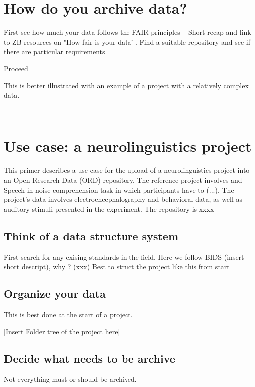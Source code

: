\documentclass[a4paper,11pt]{report}
\begin{document}
\section*{How do you archive data?}
 First see how much your data follows the FAIR principles -- Short recap and link to ZB resources on "How fair is your data' . 
 Find a suitable repository and see if there are particular requirements
 
 Proceed

This is better illustrated with an example of a project with a relatively complex data. 

--------

\section*{Use case: a neurolinguistics project} 
This primer describes a use case for the upload of a neurolinguistics project into an Open Research Data (ORD) repository. The reference project involves and Speech-in-noise comprehension task in which participants have to (...). The project's data involves electroencephalography and behavioral data, as well as auditory stimuli presented in the experiment. The repository is xxxx 

\subsection*{Think of a data structure system}

First search for any exising standards in the field. Here we follow BIDS (insert short descript), why ? (xxx)
Best to struct the project like this from start

\subsection*{Organize your data}
This is best done at the start of a project.

[Insert Folder tree of the project here]


\subsection*{Decide what needs to be archive}
Not everything must or should be archived. 
\end{document}
